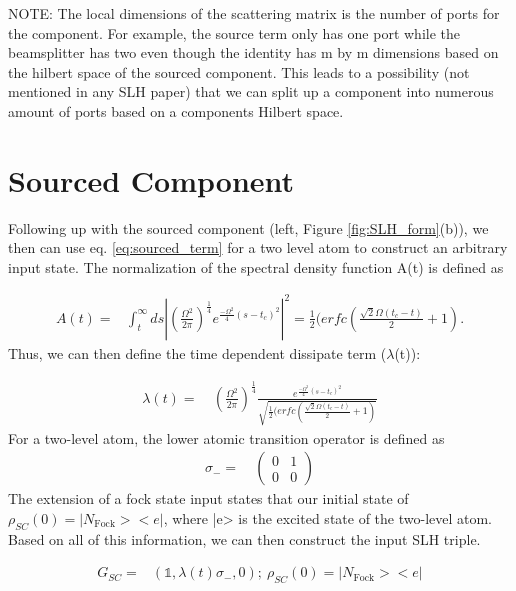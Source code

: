 \documentclass[a4paper]{article}
\begin{document}
NOTE: The local dimensions of the scattering matrix is the number of ports for the component. For example, the source term only has one port while the beamsplitter has two even though the identity has m by m dimensions based on the hilbert space of the sourced component. This leads to a possibility (not mentioned in any SLH paper) that we can split up a component into numerous amount of ports based on a components Hilbert space.

\section*{Sourced Component}
Following up with the sourced component (left, Figure \ref{fig:SLH_form}(b)), we then can use eq. \ref{eq:sourced_term} for a two level atom to construct an arbitrary input state. The normalization of the spectral density function A(t) is defined as 

\begin{align*}
    A(t) = & \int_{t}^{\infty} ds |(\frac{\Omega^2}{2\pi})^{\frac{1}{4}}e^{\frac{-\Omega^2}{4}(s-t_c)^2}|^2  = \frac{1}{2}(erfc(\frac{\sqrt{2}\Omega(t_c-t)}{2}+1).
\end{align*}
Thus, we can then define the time dependent dissipate term ($\lambda$(t)):

\begin{align*}
    \lambda(t) = & \ (\frac{\Omega^2}{2\pi})^{\frac{1}{4}}\frac{e^{\frac{-\Omega^2}{4}(s-t_c)^2}}{ \sqrt{\frac{1}{2}(erfc(\frac{\sqrt{2}\Omega(t_c-t)}{2}+1)}}
\end{align*}
For a two-level atom, the lower atomic transition operator is defined as
\begin{align*}
    \sigma_- =& \ \begin{pmatrix} 0 & 1 \\ 0 & 0 \end{pmatrix}
\end{align*}
The extension of a fock state input states that our initial state of $\rho_{SC}(0) = |N_{\text{Fock}}><e|$, where |e> is the excited state of the two-level atom. Based on all of this information, we can then construct the input SLH triple. 

\begin{align}
    G_{SC} = & ( \mathbb{1}, \lambda(t)\sigma_-, 0) ; \ \rho_{SC}(0) = |N_{\text{Fock}}><e|
    \label{eq:EX_source}
\end{align}
\end{document}
